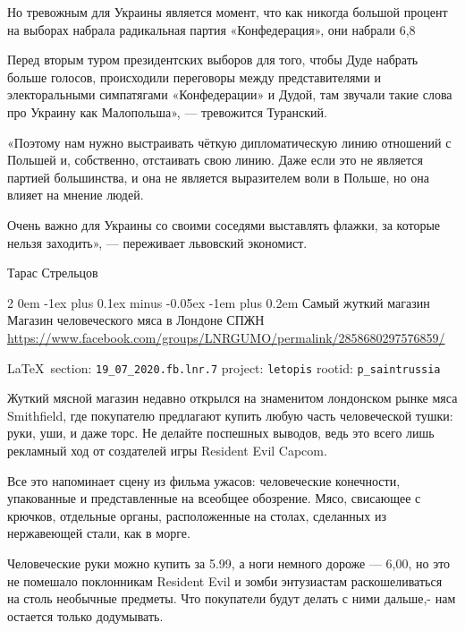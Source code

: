 \documentclass[a4paper,11pt]{extreport}
\makeatletter
\renewcommand\subsection{%
  \clearpage
    \@startsection{subsection}%
    {2}%
    {0em}%
    {-1ex plus 0.1ex minus -0.05ex}%
    {-1em plus 0.2em}%
    {\scshape\bfseries\Large}%
}
\makeatother
\begin{document}
Но тревожным для Украины является момент, что как никогда большой процент на
выборах набрала радикальная партия «Конфедерация», они набрали 6,8%

Перед вторым туром президентских выборов для того, чтобы Дуде набрать больше
голосов, происходили переговоры между представителями и электоральными
симпатягами «Конфедерации» и Дудой, там звучали такие слова про Украину как
Малопольша», --- тревожится Туранский.

«Поэтому нам нужно выстраивать чёткую дипломатическую линию отношений с Польшей
и, собственно, отстаивать свою линию. Даже если это не является партией
большинства, и она не является выразителем воли в Польше, но она влияет на
мнение людей.

Очень важно для Украины со своими соседями выставлять флажки, за которые нельзя
заходить», --- переживает львовский экономист.

Тарас Стрельцов 
 
 
\subsection{Самый жуткий магазин Магазин человеческого мяса в Лондоне СПЖН}
\label{sec:19_07_2020.fb.lnr.7}
\url{https://www.facebook.com/groups/LNRGUMO/permalink/2858680297576859/}
  
\vspace{0.5cm}
{\small\LaTeX~section: \verb|19_07_2020.fb.lnr.7| project: \verb|letopis| rootid: \verb|p_saintrussia|}
\vspace{0.5cm}
  
Жуткий мясной магазин недавно открылся на знаменитом лондонском рынке мяса
Smithfield, где покупателю предлагают купить любую часть человеческой тушки:
руки, уши, и даже торс. Не делайте поспешных выводов, ведь это всего лишь
рекламный ход от создателей игры Resident Evil Capcom.

Все это напоминает сцену из фильма ужасов: человеческие конечности, упакованные
и представленные на всеобщее обозрение. Мясо, свисающее с крючков, отдельные
органы, расположенные на столах, сделанных из нержавеющей стали, как в морге.

Человеческие руки можно купить за 5.99, а ноги немного дороже --- 6,00, но это не
помешало поклонникам Resident Evil и зомби энтузиастам раскошеливаться на столь
необычные предметы. Что покупатели будут делать с ними дальше,- нам остается
только додумывать.
\end{document}
